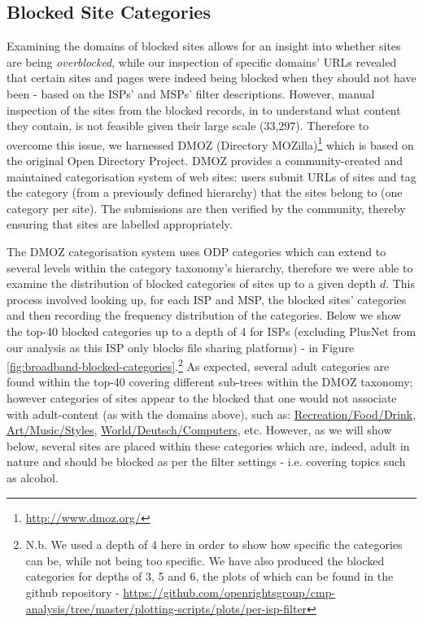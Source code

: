 \documentclass{bmcart}
\begin{document}
\subsection*{Blocked Site Categories}
Examining the domains of blocked sites allows for an insight into whether sites are being \textit{overblocked}, while our inspection of specific domains' URLs revealed that certain sites and pages were indeed being blocked when they should not have been - based on the ISPs' and MSPs' filter descriptions.
However, manual inspection of the sites from the blocked records, in to understand what content they contain, is not feasible given their large scale (33,297).
Therefore to overcome this issue, we harnessed DMOZ (Directory MOZilla)\footnote{\url{http://www.dmoz.org/}} which is based on the original Open Directory Project.
DMOZ provides a community-created and maintained categorisation system of web sites: users submit URLs of sites and tag the category (from a previously defined hierarchy) that the sites belong to (one category per site).
The submissions are then verified by the community, thereby ensuring that sites are labelled appropriately.

The DMOZ categorisation system uses ODP categories which can extend to several levels within the category taxonomy's hierarchy, therefore we were able to examine the distribution of blocked categories of sites up to a given depth $d$.
This process involved looking up, for each ISP and MSP, the blocked sites' categories and then recording the frequency distribution of the categories.
Below we show the top-40 blocked categories up to a depth of 4 for ISPs (excluding PlusNet from our analysis as this ISP only blocks file sharing platforms) - in Figure \ref{fig:broadband-blocked-categories}.\footnote{N.b. We used a depth of 4 here in order to show how specific the categories can be, while not being too specific. We have also produced the blocked categories for depths of 3, 5 and 6, the plots of which can be found in the github repository - \url{https://github.com/openrightsgroup/cmp-analysis/tree/master/plotting-scripts/plots/per-isp-filter}}
As expected, several adult categories are found within the top-40 covering different sub-trees within the DMOZ taxonomy; however categories of sites appear to the blocked that one would not associate with adult-content (as with the domains above), such as: \url{Recreation/Food/Drink}, \url{Art/Music/Styles}, \url{World/Deutsch/Computers}, etc.
However, as we will show below, several sites are placed within these categories which are, indeed, adult in nature and should be blocked as per the filter settings - i.e. covering topics such as alcohol.
\end{document}

